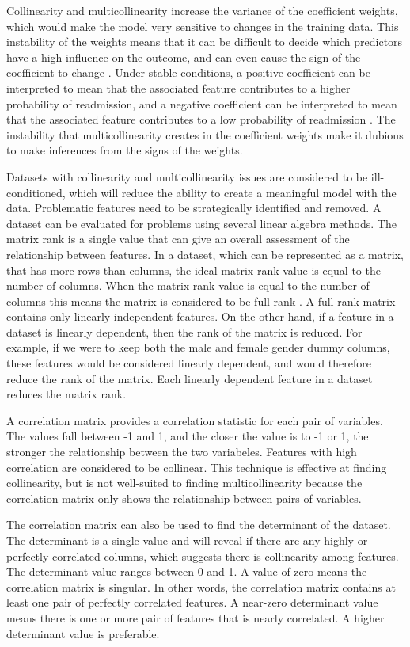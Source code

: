 \documentclass[sigconf]{acmart}
\begin{document}
Collinearity and multicollinearity increase the variance of the coefficient weights, which would make the model very sensitive to changes in the training data. This instability of the weights means that it can be difficult to decide which predictors have a high influence on the outcome, and can even cause the sign of the coefficient to change \cite{cite16}. Under stable conditions, a positive coefficient can be interpreted to mean that the associated feature contributes to a higher probability of readmission, and a negative coefficient can be interpreted to mean that the associated feature contributes to a low probability of readmission \cite{cite03}. The instability that multicollinearity creates in the coefficient weights make it dubious to make inferences from the signs of the weights.

Datasets with collinearity and multicollinearity issues are considered to be ill-conditioned, which will reduce the ability to create a meaningful model with the data. Problematic features need to be strategically identified and removed. A dataset can be evaluated for problems using several linear algebra methods. The matrix rank is a single value that can give an overall assessment of the relationship between features. In a dataset, which can be represented as a matrix, that has more rows than columns, the ideal matrix rank value is equal to the number of columns. When the matrix rank value is equal to the number of columns this means the matrix is considered to be full rank \cite{cite14}. A full rank matrix contains only linearly independent features. On the other hand, if a feature in a dataset is linearly dependent, then the rank of the matrix is reduced. For example, if we were to keep both the male and female gender dummy columns, these features would be considered linearly dependent, and would therefore reduce the rank of the matrix. Each linearly dependent feature in a dataset reduces the matrix rank.

A correlation matrix provides a correlation statistic for each pair of variables. The values fall between -1 and 1, and the closer the value is to -1 or 1, the stronger the relationship between the two variabeles. Features with high correlation are considered to be collinear. This technique is effective at finding collinearity, but is not well-suited to finding multicollinearity because the correlation matrix only shows the relationship between pairs of variables.

The correlation matrix can also be used to find the determinant of the dataset. The determinant is a single value and  will reveal if there are any highly or perfectly correlated columns, which suggests there is collinearity among features. The determinant value ranges between 0 and 1. A value of zero means the correlation matrix is singular. In other words, the correlation matrix contains at least one pair of perfectly correlated features. A near-zero determinant value means there is one or more pair of features that is nearly correlated. A higher determinant value is preferable.
\end{document}
